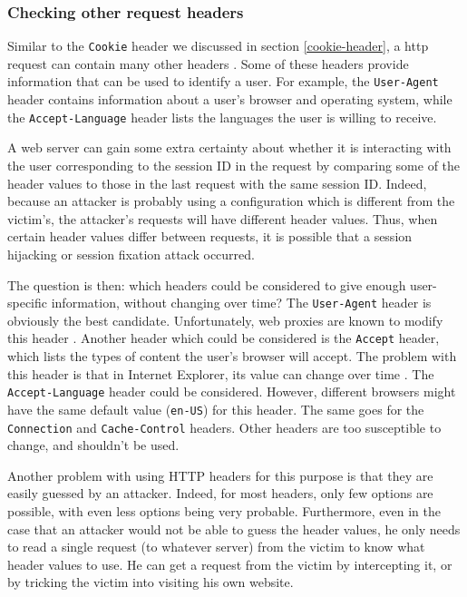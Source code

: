 \subsubsection{Checking other request headers}

Similar to the \texttt{Cookie} header we discussed in section \ref{cookie-header}, a \gls{http} request can contain many other headers \cite{rfc2616}. Some of these headers provide information that can be used to identify a user. For example, the \texttt{User-Agent} header contains information about a user's browser and operating system, while the \texttt{Accept-Language} header lists the languages the user is willing to receive.

A web server can gain some extra certainty about whether it is interacting with the user corresponding to the session ID in the request by comparing some of the header values to those in the last request with the same session ID. Indeed, because an attacker is probably using a configuration which is different from the victim's, the attacker's requests will have different header values. Thus, when certain header values differ between requests, it is possible that a session hijacking or session fixation attack occurred.

The question is then: which headers could be considered to give enough user-specific information, without changing over time? The \texttt{User-Agent} header is obviously the best candidate. Unfortunately, web proxies are known to modify this header \cite{ShiflettHijacking}. Another header which could be considered is the \texttt{Accept} header, which lists the types of content the user's browser will accept. The problem with this header is that in Internet Explorer, its value can change over time \cite{ShiflettHijacking}. The \texttt{Accept-Language} header could be considered. However, different browsers might have the same default value (\texttt{en-US}) for this header. The same goes for the \texttt{Connection} and \texttt{Cache-Control} headers. Other headers are too susceptible to change, and shouldn't be used.

Another problem with using HTTP headers for this purpose is that they are easily guessed by an attacker. Indeed, for most headers, only few options are possible, with even less options being very probable. Furthermore, even in the case that an attacker would not be able to guess the header values, he only needs to read a single request (to whatever server) from the victim to know what header values to use. He can get a request from the victim by intercepting it, or by tricking the victim into visiting his own website.

